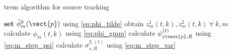 \begin{algorithm}[H]\label{alg:trem}
\caption{\acrshort{trem} algorithm for source tracking}
\begin{algorithmic}
\State \textbf{set} $\tilde\phi^k_m(\vect{p})$ using \eqref{eq:phi_tilde}
\State obtain $z_m^1(t,k), z_m^2(t,k)\ \forall\ k,m$
\State calculate $\phi_m(t,k)$ using \eqref{eq:phi_gmm}
\State calculate $\psi^{(t)}_{s\vect{p},R}$ using \eqref{eq:m_step_psi}
\State calculate $\sigma^{2,(t)}_{s,R}$ using \eqref{eq:m_step_var}
\EndFor
\end{algorithmic}
\end{algorithm}